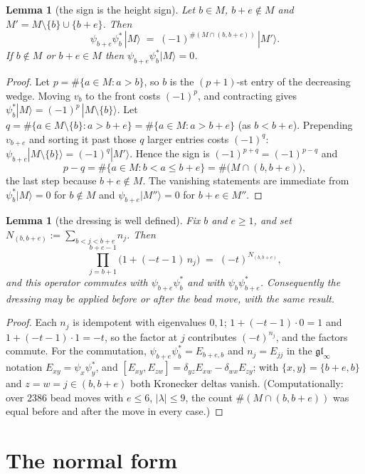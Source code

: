 \documentclass[11pt]{article}
\newtheorem{lemma}[theorem]{Lemma}
\theoremstyle{definition}
\begin{document}
\begin{lemma}[the sign is the height sign]\label{lem:sign}
Let $b\in M$, $b+e\notin M$ and $M'=M\setminus\{b\}\cup\{b+e\}$.  Then
\[
   \psi_{b+e}\psi_b^{*}\,|M\rangle \;=\; (-1)^{\#(M\cap(b,b+e))}\,|M'\rangle .
\]
If $b\notin M$ or $b+e\in M$ then $\psi_{b+e}\psi_b^{*}|M\rangle=0$.
\end{lemma}

\begin{proof}
Let $p=\#\{a\in M: a>b\}$, so $b$ is the $(p+1)$-st entry of the decreasing wedge.
Moving $v_b$ to the front costs $(-1)^{p}$, and contracting gives
$\psi_b^{*}|M\rangle=(-1)^{p}\,|M\setminus\{b\}\rangle$.
Let $q=\#\{a\in M\setminus\{b\}: a>b+e\}=\#\{a\in M:a>b+e\}$ (as $b<b+e$).
Prepending $v_{b+e}$ and sorting it past those $q$ larger entries costs $(-1)^{q}$:
$\psi_{b+e}|M\setminus\{b\}\rangle=(-1)^{q}|M'\rangle$.  Hence the sign is
$(-1)^{p+q}=(-1)^{p-q}$ and
\[
 p-q=\#\{a\in M: b<a\le b+e\}=\#\bigl(M\cap(b,b+e)\bigr),
\]
the last step because $b+e\notin M$.  The vanishing statements are immediate from
$\psi_b^{*}|M\rangle=0$ for $b\notin M$ and $\psi_{b+e}|M''\rangle=0$ for
$b+e\in M''$.
\end{proof}

\begin{lemma}[the dressing is well defined]\label{lem:dressing}
Fix $b$ and $e\ge1$, and set $N_{(b,b+e)}:=\sum_{b<j<b+e}n_j$.  Then
\[
  \prod_{j=b+1}^{b+e-1}\bigl(1+(-t-1)\,n_j\bigr)\;=\;(-t)^{N_{(b,b+e)}},
\]
and this operator commutes with $\psi_{b+e}\psi_b^{*}$ and with
$\psi_b\psi_{b+e}^{*}$.  Consequently the dressing may be applied before or after
the bead move, with the same result.
\end{lemma}

\begin{proof}
Each $n_j$ is idempotent with eigenvalues $0,1$; $1+(-t-1)\cdot0=1$ and
$1+(-t-1)\cdot1=-t$, so the factor at $j$ contributes $(-t)^{n_j}$, and the factors
commute.  For the commutation, $\psi_{b+e}\psi_b^{*}=E_{b+e,b}$ and
$n_j=E_{jj}$ in the $\mathfrak{gl}_\infty$ notation $E_{xy}=\psi_x\psi_y^{*}$, and
$[E_{xy},E_{zw}]=\delta_{yz}E_{xw}-\delta_{wx}E_{zy}$; with
$\{x,y\}=\{b+e,b\}$ and $z=w=j\in(b,b+e)$ both Kronecker deltas vanish.
(Computationally: over $2386$ bead moves with $e\le6$, $|\lambda|\le9$, the count
$\#(M\cap(b,b+e))$ was equal before and after the move in every case.)
\end{proof}

\section{The normal form}
\end{document}
